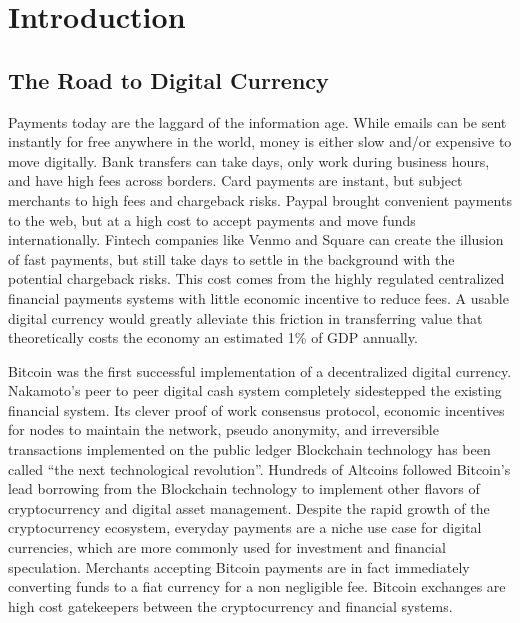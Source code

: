 \documentclass[a4paper,12pt]{article} %
\begin{document}
\pagebreak

\tableofcontents
\newpage

\listoffigures
\pagebreak

\listoftables
\pagebreak

\section{Introduction} \label{sec:1}

\subsection{The Road to Digital Currency} \label{ssec:1.1}
Payments today are the laggard of the information age. While emails can be sent instantly for free anywhere in the world, money is either slow and/or expensive to move digitally. Bank transfers can take days, only work during business hours, and have high fees across borders. Card payments are instant, but subject merchants to high fees and chargeback risks. Paypal brought convenient payments to the web, but at a high cost to accept payments and move funds internationally. Fintech companies like Venmo and Square can create the illusion of fast payments, but still take days to settle in the background with the potential chargeback risks. This cost comes from the highly regulated centralized financial payments systems with little economic incentive to reduce fees. A usable digital currency would greatly alleviate this friction in transferring value that theoretically costs the economy an estimated 1\% of GDP annually\cite{kaarmann2013cost}.

Bitcoin was the first successful implementation of a decentralized digital currency. Nakamoto's peer to peer digital cash system completely sidestepped the existing financial system\cite{nakamoto2008bitcoin}. Its clever proof of work consensus protocol, economic incentives for nodes to maintain the network, pseudo anonymity, and irreversible transactions implemented on the public ledger Blockchain technology has been called ``the next technological revolution''\cite{BlockchainRevolution}. Hundreds of Altcoins followed Bitcoin's lead borrowing from the Blockchain technology to implement other flavors of cryptocurrency and digital asset management\cite{coinMarketCap}. Despite the rapid growth of the cryptocurrency ecosystem, everyday payments are a niche use case for digital currencies, which are more commonly used for investment and financial speculation\cite{Khairuddin:2016:EMB:2851581.2892500}. Merchants accepting Bitcoin payments are in fact immediately converting funds to a fiat currency for a non negligible fee. Bitcoin exchanges are high cost gatekeepers between the cryptocurrency and financial systems.
\end{document}

